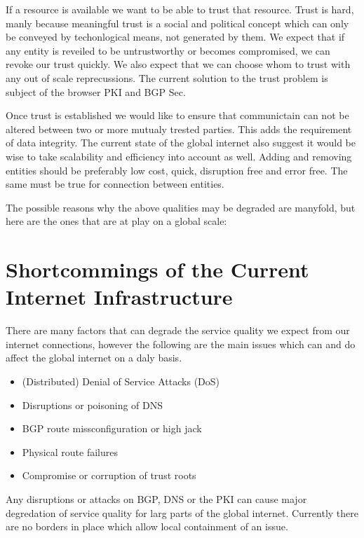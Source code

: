 \documentclass[../eva1_scion.tex]{subfiles}
\begin{document}
If a resource is available we want to be able to trust that resource. Trust is hard, manly because meaningful trust is a social and political concept which can only be conveyed by techonlogical means, not generated by them. We expect that if any entity is reveiled to be untrustworthy or becomes compromised, we can revoke our trust quickly. We also expect that we can choose whom to trust with any out of scale reprecussions. The current solution to the trust problem is subject of the browser PKI and BGP Sec.

Once trust is established we would like to ensure that communictain can not be altered between two or more mutualy trested parties. This adds the requirement of data integrity. The current state of the global internet also suggest it would be wise to take scalability and efficiency into account as well. Adding and removing entities should be preferably low cost, quick, disruption free and error free. The same must be true for connection between entities.

The possible reasons why the above qualities may be degraded are manyfold, but here are the ones that are at play on a global scale:

\section{Shortcommings of the Current Internet Infrastructure}%
\label{sec:shortcommings}

There are many factors that can degrade the service quality we expect from our internet connections, however the following are the main issues which can and do affect the global internet on a daly basis.

\begin{itemize}
    \item (Distributed) Denial of Service Attacks (DoS)
    \item Disruptions or poisoning of DNS
    \item BGP route missconfiguration or high jack
    \item Physical route failures
    \item Compromise or corruption of trust roots
\end{itemize}

Any disruptions or attacks on BGP, DNS or the PKI can cause major degredation of service quality for larg parts of the global internet. Currently there are no borders in place which allow local containment of an issue.
\end{document}
